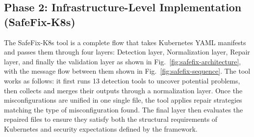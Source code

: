 \documentclass[preprint,12pt]{elsarticle}
\begin{document}
\subsection{Phase 2: Infrastructure-Level Implementation (SafeFix-K8s)}

The SafeFix-K8s tool is a complete flow that takes Kubernetes YAML manifests and passes them through four layers: Detection layer, Normalization layer, Repair layer, and finally the validation layer as shown in Fig.~\ref{fig:safefix-architecture}, with the message flow between them shown in Fig.~\ref{fig:safefix-sequence}. The tool works as follows: it first runs 13 detection tools to uncover potential problems, then collects and merges their outputs through a normalization layer. Once the misconfigurations are unified in one single file, the tool applies repair strategies matching the type of misconfiguration found. The final layer then evaluates the repaired files to ensure they satisfy both the structural requirements of Kubernetes and security expectations defined by the framework.
\end{document}

